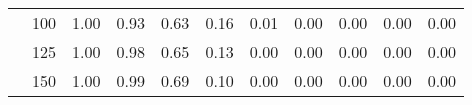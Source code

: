\begin{table}[t]
\begin{center}
\begin{subtable}[c]{\textwidth}
\begin{center}
\begin{tabular}{rcccccccccc}
                                        & \multicolumn{1}{c|}{100}  & \num{1.00}  & \num{0.93}  & \num{0.63}  & \num{0.16}  & \num{0.01}  & \num{0.00}  & \num{0.00}  & \num{0.00}  & \num{0.00}  \\
                                        & \multicolumn{1}{c|}{125}  & \num{1.00}  & \num{0.98}  & \num{0.65}  & \num{0.13}  & \num{0.00}  & \num{0.00}  & \num{0.00}  & \num{0.00}  & \num{0.00}  \\
                                        & \multicolumn{1}{c|}{150}  & \num{1.00}  & \num{0.99}  & \num{0.69}  & \num{0.10}  & \num{0.00}  & \num{0.00}  & \num{0.00}  & \num{0.00}  & \num{0.00}  \\
                                    \end{tabular}
            \end{center}
        \end{subtable}

        \vspace{5mm}


\end{center}
\end{table}
